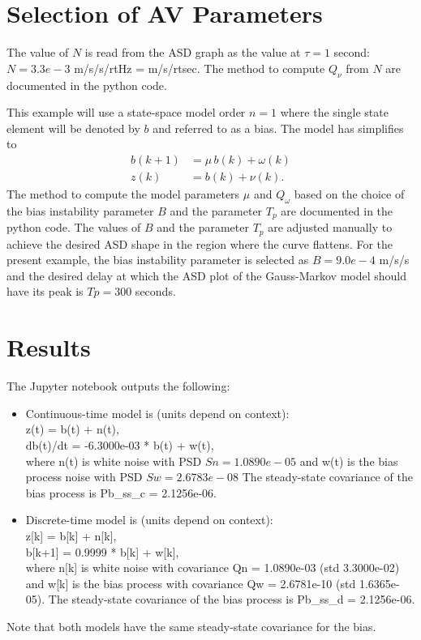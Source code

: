 \documentclass[letter,twocolumn]{article}
\begin{document}
\section{Selection of AV Parameters}
The value of $N$ is read from the ASD graph as the value at $\tau = 1$ second: $N= 3.3e-3$ m/s/s/rtHz = m/s/rtsec. The method to compute $Q_\nu$ from $N$ are documented in the python code.  


This example will use a state-space model order $n=1$ where the single state element will be denoted by $b$ and referred to as a bias. The model has simplifies to 
\begin{align}
	b(k+1) &= \mu\, b(k) + \omega(k) \\
	z(k)   &= b(k) + \nu(k).
\end{align}
The method to compute the  model parameters $\mu$ and $Q_\omega$ based on the choice of the bias instability parameter $B$ and the parameter $T_p$ are documented in the python code. The values of $B$ and the parameter $T_p$ are adjusted manually to achieve the desired ASD shape in the region where the curve flattens. 
For the present example, the bias instability parameter is selected as
$B  = 9.0e-4$ m/s/s
and the desired delay at which the ASD plot of the Gauss-Markov model should have its peak is
$Tp = 300$  seconds.

\section{Results}
The Jupyter notebook outputs the following:
\begin{itemize}
	\item 
	Continuous-time model is (units depend on context): \\
	z(t) = b(t) + n(t), \\
	db(t)/dt = -6.3000e-03 * b(t) + w(t), \\
	where n(t) is white noise with PSD $Sn = 1.0890e-05$
	and w(t) is the bias process noise with PSD $Sw = 2.6783e-08$
	The steady-state covariance of the bias process is Pb\_ss\_c = 2.1256e-06.
	
	\item Discrete-time model is (units depend on context): \\
	z[k] = b[k] + n[k], \\
	b[k+1] = 0.9999 * b[k] + w[k], \\
	where n[k] is white noise with covariance Qn = 1.0890e-03 (std 3.3000e-02)
	and w[k] is the bias process with covariance Qw = 2.6781e-10 (std 1.6365e-05).
	The steady-state covariance of the bias process is Pb\_ss\_d = 2.1256e-06.
\end{itemize}
Note that both models have the same steady-state covariance for the bias.
\end{document}
